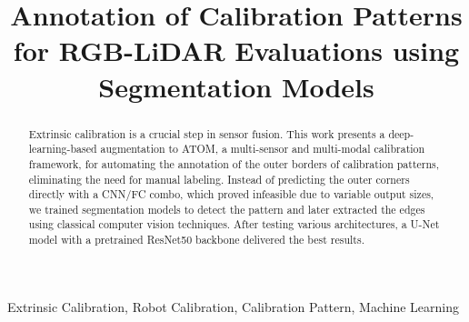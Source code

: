 \documentclass[conference]{IEEEtran}
\begin{document}
\title{Annotation of Calibration Patterns for RGB-LiDAR Evaluations using Segmentation Models\\
{}
}

\author{
\and
{}
}


\maketitle

\begin{abstract}
    Extrinsic calibration is a crucial step in sensor fusion. This work presents a deep-learning-based augmentation to ATOM, a
    multi-sensor and multi-modal calibration framework, for automating the annotation of the outer borders of calibration patterns,
    eliminating the need for manual labeling. Instead of predicting the outer corners directly with a CNN/FC combo, which proved
    infeasible due to variable output sizes, we trained segmentation models to detect the pattern and later extracted the edges using
  classical computer vision techniques. After testing various architectures, a U-Net model with a pretrained ResNet50 backbone delivered
  the best results.
\end{abstract}

\begin{IEEEkeywords}
Extrinsic Calibration, Robot Calibration, Calibration Pattern, Machine Learning
\end{IEEEkeywords}
\end{document}
